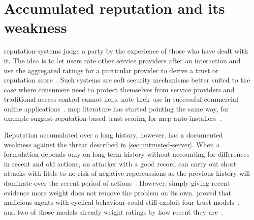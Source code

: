 \section{Accumulated reputation and its weakness}\label{sec:reputation}

\Glspl{reputation-system} judge a party by the experience of those who have dealt with it. The idea is to let users rate other service providers after an interaction and use the aggregated ratings for a particular provider to derive a \gls{trust} or \gls{reputation} score~\cite[p.~618]{Jsang2007}. Such systems are soft security mechanisms better suited to the case where consumers need to protect themselves from service providers and traditional access control cannot help. \textcite{Jsang2007} note their use in successful commercial online applications~\cite[pp.~618,~622]{Jsang2007}. \Gls{mcp} literature has started pointing the same way, for example \textcite{Hou2026} suggest reputation-based trust scoring for \gls{mcp} auto-installers~\cite[p.~22]{Hou2026}.

Reputation accumulated over a long history, however, has a documented weakness against the threat described in \cref{sec:untrusted-server}. When a formulation depends only on long-term history without accounting for differences in recent and old actions, an attacker with a good record can carry out short attacks with little to no risk of negative repercussions as the previous history will dominate over the recent period of actions~\cite[p.~1:13]{Hoffman2009}. However, simply giving recent evidence more weight does not remove the problem on its own. \textcite{Salehi-Abari2010} proved that malicious agents with cyclical behaviour could still exploit four trust models~\cite[p.~847]{Salehi-Abari2010}, and two of those models already weight ratings by how recent they are~\cite[p.~843]{Salehi-Abari2010}.

